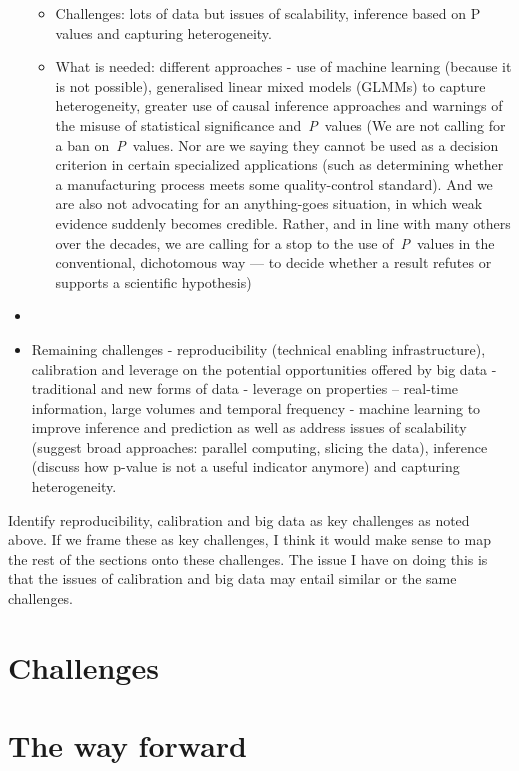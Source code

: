 \documentclass[11pt,letterpaper]{article}
\begin{document}
\begin{itemize}
  \begin{itemize}
  \item
    Challenges: lots of data but issues of scalability, inference based on P values and capturing heterogeneity.
  \item
    What is needed: different approaches - use of machine learning (because it is not possible), generalised linear mixed models (GLMMs) to capture heterogeneity, greater use of causal inference approaches and warnings of the misuse of statistical significance and~\emph{P}~values (We are not calling for a ban on~\emph{P}~values. Nor are we saying they cannot be used as a decision criterion in certain specialized applications (such as determining whether a manufacturing process meets some quality-control standard).
    And we are also not advocating for an anything-goes situation, in which weak evidence suddenly becomes credible.
    Rather, and in line with many others over the decades, we are calling for a stop to the use of~\emph{P}~values in the conventional, dichotomous way --- to decide whether a result refutes or supports a scientific hypothesis)
  \end{itemize}
\item
\item
  Remaining challenges - reproducibility (technical enabling infrastructure), calibration and leverage on the potential opportunities offered by big data - traditional and new forms of data - leverage on properties -- real-time information, large volumes and temporal frequency - machine learning to improve inference and prediction as well as address issues of scalability (suggest broad approaches: parallel computing, slicing the data), inference (discuss how p-value is not a useful indicator anymore) and capturing heterogeneity.
\end{itemize}

Identify reproducibility, calibration and big data as key challenges as noted above.
If we frame these as key challenges, I think it would make sense to map the rest of the sections onto these challenges.
The issue I have on doing this is that the issues of calibration and big data may entail similar or the same challenges.

\hypertarget{challenges}{%
\section{Challenges}\label{challenges}}

\hypertarget{the-way-forward}{%
\section{The way forward}\label{the-way-forward}}
\end{document}

